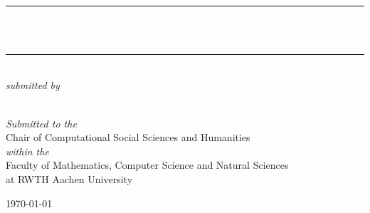 %
%
%
% 
%


\begin{titlepage} %
\newcommand{\HRule}{\rule{\linewidth}{0.5mm}} %
\center %
\textsc{\LARGE \TypeofThesis}\\[1.5cm] %
\HRule\\[0.4cm]
{\huge\bfseries \TitleofThesis}\\[0.4cm] %
\HRule\\[1.5cm]
    \vfill
    \textit{\large submitted by}\\[0.5cm] %
\textsc{\Large \AuthorofThesis}\\[0.5cm] %
    \vfill

{\large\textit{Submitted to the}}\\
\Large Chair of Computational Social Sciences and Humanities \\
    {\large\textit{within the}}\\
    Faculty of Mathematics, Computer Science and Natural Sciences \\
    at RWTH Aachen University 
    
\vfill\vfill\vfill %
{\large\today} %


\end{titlepage}
